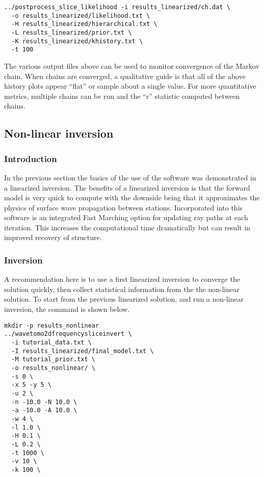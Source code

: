 \documentclass[a4paper,12pt]{article}
\begin{document}
\begin{verbatim}
../postprocess_slice_likelihood -i results_linearized/ch.dat \
  -o results_linearized/likelihood.txt \
  -H results_linearized/hierarchical.txt \
  -L results_linearized/prior.txt \
  -K results_linearized/khistory.txt \
  -t 100
\end{verbatim}

The various output files above can be used to monitor convergence of
the Markov chain. When chains are converged, a qualitative guide is
that all of the above history plots appear ``flat'' or sample about a
single value. For more quantitative metrics, multiple chains can be
run and the ``r'' statistic computed between
chains\citep{Hawkins:2017:A}.

\subsection{Non-linear inversion}

\subsubsection{Introduction}

In the previous section the basics of the use of the software was
demonstrated in a linearized inversion. The benefits of a linearized
inversion is that the forward model is very quick to compute with the downside
being that it approximates the physics of surface wave propagation between
stations. Incorporated into this software is an integrated Fast Marching
option for updating ray paths at each iteration. This increases the
computational time dramatically but can result in improved recovery of
structure.

\subsubsection{Inversion}

A recommendation here is to use a first linearized inversion to converge
the solution quickly, then collect statistical information from
the the non-linear solution. To start from the previous linearized
solution, and run a non-linear inversion, the command is shown below.

\begin{verbatim}
mkdir -p results_nonlinear
../wavetomo2dfrequencysliceinvert \
  -i tutorial_data.txt \
  -I results_linearized/final_model.txt \
  -M tutorial_prior.txt \
  -o results_nonlinear/ \
  -s 0 \
  -x 5 -y 5 \
  -u 2 \
  -n -10.0 -N 10.0 \
  -a -10.0 -A 10.0 \
  -w 4 \
  -l 1.0 \
  -H 0.1 \
  -L 0.2 \
  -t 1000 \
  -v 10 \
  -k 100 \
\end{verbatim}
\end{document}

